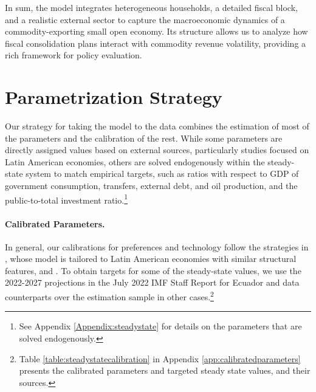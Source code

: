 \documentclass[12pt]{article}
\begin{document}
In sum, the model integrates heterogeneous households, a detailed fiscal block, and a realistic external sector to capture the macroeconomic dynamics of a commodity-exporting small open economy. Its structure allows us to analyze how fiscal consolidation plans interact with commodity revenue volatility, providing a rich framework for policy evaluation.


\section{Parametrization Strategy}\label{sec:parametrization}

Our strategy for taking the model to the data combines the estimation of most of the parameters and the calibration of the rest. While some parameters are directly assigned values based on external sources, particularly studies focused on Latin American economies, others are solved endogenously within the steady-state system to match empirical targets, such as ratios with respect to GDP of government consumption, transfers, external debt, and oil production, and the public-to-total investment ratio.\footnote{See Appendix \ref{Appendix:steadystate} for details on the parameters that are solved endogenously.}

\paragraph{Calibrated Parameters.}
In general, our calibrations for preferences and technology follow the strategies in \citet{MedinaSoto2016}, whose model is tailored to Latin American economies with similar structural features, and \citet{coenen2013gauging}. To obtain targets for some of the steady-state values, we use the 2022-2027 projections in the July 2022 IMF Staff Report for Ecuador \citep[see][]{oner2022imf} and data counterparts over the estimation sample in other cases.\footnote{Table \ref{table:steadystatecalibration} in Appendix \ref{app:calibratedparameters} presents the calibrated parameters and targeted steady state values, and their sources.}
\end{document}
